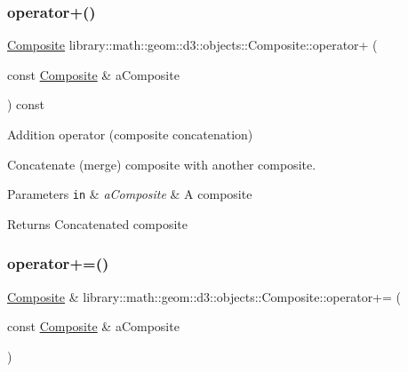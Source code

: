 \subsubsection{\texorpdfstring{operator+()}{operator+()}}
{\footnotesize\ttfamily \hyperlink{classlibrary_1_1math_1_1geom_1_1d3_1_1objects_1_1_composite}{Composite} library\+::math\+::geom\+::d3\+::objects\+::\+Composite\+::operator+ (\begin{DoxyParamCaption}\item[{const \hyperlink{classlibrary_1_1math_1_1geom_1_1d3_1_1objects_1_1_composite}{Composite} \&}]{a\+Composite }\end{DoxyParamCaption}) const}



Addition operator (composite concatenation) 

Concatenate (merge) composite with another composite.


\begin{DoxyParams}[1]{Parameters}
\mbox{\tt in}  & {\em a\+Composite} & A composite \\
\hline
\end{DoxyParams}
\begin{DoxyReturn}{Returns}
Concatenated composite 
\end{DoxyReturn}
\mbox{\label{classlibrary_1_1math_1_1geom_1_1d3_1_1objects_1_1_composite_aed5e20eedc5bd3094752bc71e73a85a6}} 
\subsubsection{\texorpdfstring{operator+=()}{operator+=()}}
{\footnotesize\ttfamily \hyperlink{classlibrary_1_1math_1_1geom_1_1d3_1_1objects_1_1_composite}{Composite} \& library\+::math\+::geom\+::d3\+::objects\+::\+Composite\+::operator+= (\begin{DoxyParamCaption}\item[{const \hyperlink{classlibrary_1_1math_1_1geom_1_1d3_1_1objects_1_1_composite}{Composite} \&}]{a\+Composite }\end{DoxyParamCaption})}



